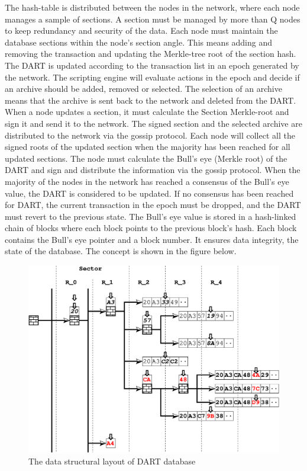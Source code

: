 The hash-table is distributed between the nodes in the network, where each node manages a sample of sections. A section must be managed by more than Q nodes to keep redundancy and security of the data.
Each node must maintain the database sections within the node's section angle. This means adding and removing the transaction and updating the Merkle-tree root of the section hash.
The DART is updated according to the transaction list in an epoch generated by the network. The scripting engine will evaluate actions in the epoch and decide if an archive should be added, removed or selected. The selection of an archive means that the archive is sent back to the network and deleted from the DART. When a node updates a section, it must calculate the Section Merkle-root and sign it and send it to the network.
The signed section and the selected archive are distributed to the network via the gossip protocol. Each node will collect all the signed roots of the updated section when the majority has been reached for all updated sections. The node must calculate the Bull's eye (Merkle root) of the DART and sign and distribute the information via the gossip protocol. When the majority of the nodes in the network has reached a consensus of the Bull's eye value, the DART is considered to be updated.
If no consensus has been reached for DART, the current transaction in the epoch must be dropped, and the DART must revert to the previous state.
The Bull's eye value is stored in a hash-linked chain of blocks where each block points to the previous block's hash. Each block contains the Bull's eye pointer and a block number. It ensures data integrity, the state of the database. The concept is shown in the figure below.

\begin{figure}[H]
 \centering
 \includegraphics[width=1.0\textwidth]{fig/dart_tree_bw.eps}
 \caption{The data structural layout of DART database}
 \label{fig:dart}
\end{figure}



